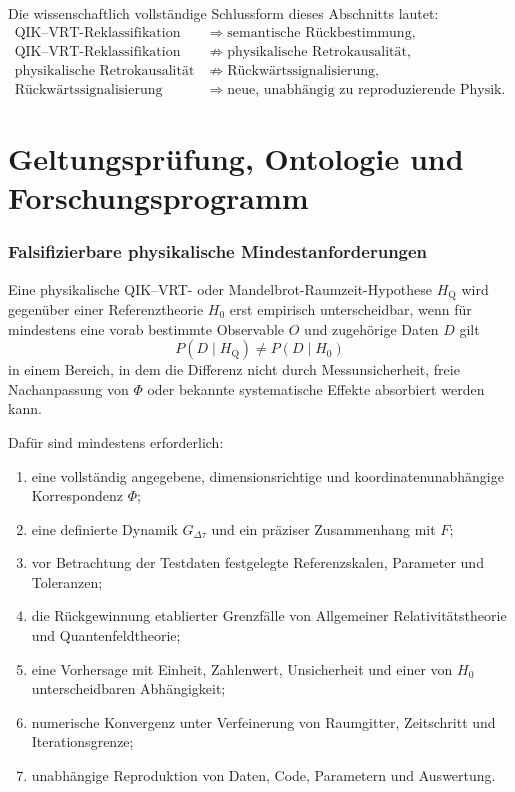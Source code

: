 \documentclass[11pt,a4paper]{article}
\theoremstyle{remark}
\begin{document}
Die wissenschaftlich vollständige Schlussform dieses Abschnitts lautet:
\[
\boxed{
\begin{aligned}
\text{QIK--VRT-Reklassifikation}
&\Longrightarrow
\text{semantische Rückbestimmung},\\
\text{QIK--VRT-Reklassifikation}
&\not\Longrightarrow
\text{physikalische Retrokausalität},\\
\text{physikalische Retrokausalität}
&\not\Longrightarrow
\text{Rückwärtssignalisierung},\\
\text{Rückwärtssignalisierung}
&\Longrightarrow
\text{neue, unabhängig zu reproduzierende Physik}.
\end{aligned}}
\]

\clearpage
\part{Geltungsprüfung, Ontologie und Forschungsprogramm}

\section{Falsifizierbare physikalische Mindestanforderungen}
\label{sec:phys-falsifikation}

Eine physikalische QIK--VRT- oder Mandelbrot-Raumzeit-Hypothese
\(H_{\mathrm Q}\) wird gegenüber einer Referenztheorie \(H_0\) erst
empirisch unterscheidbar, wenn für mindestens eine vorab bestimmte Observable
\(O\) und zugehörige Daten \(D\) gilt
\[
  P(D\mid H_{\mathrm Q})\neq P(D\mid H_0)
\]
in einem Bereich, in dem die Differenz nicht durch Messunsicherheit, freie
Nachanpassung von \(\Phi\) oder bekannte systematische Effekte absorbiert
werden kann.

Dafür sind mindestens erforderlich:
\begin{enumerate}
  \item eine vollständig angegebene, dimensionsrichtige und
  koordinatenunabhängige Korrespondenz \(\Phi\);
  \item eine definierte Dynamik \(G_{\Delta\tau}\) und ein präziser
  Zusammenhang mit \(F\);
  \item vor Betrachtung der Testdaten festgelegte Referenzskalen, Parameter
  und Toleranzen;
  \item die Rückgewinnung etablierter Grenzfälle von Allgemeiner
  Relativitätstheorie und Quantenfeldtheorie;
  \item eine Vorhersage mit Einheit, Zahlenwert, Unsicherheit und einer von
  \(H_0\) unterscheidbaren Abhängigkeit;
  \item numerische Konvergenz unter Verfeinerung von Raumgitter, Zeitschritt
  und Iterationsgrenze;
  \item unabhängige Reproduktion von Daten, Code, Parametern und Auswertung.
\end{enumerate}
\end{document}
